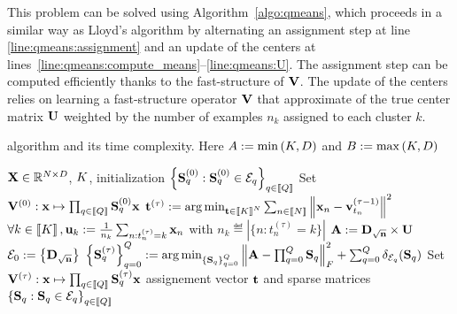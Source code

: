 This problem can be solved using Algorithm~\ref{algo:qmeans},
which proceeds in a similar way as Lloyd's algorithm by alternating an assignment step at line \ref{line:qmeans:assignment} and an update of the centers at lines~\ref{line:qmeans:compute_means}--\ref{line:qmeans:U}. The assignment step can be computed efficiently thanks to the fast-structure of ${\mathbf{V}}$. The update of the centers relies on learning a fast-structure operator ${\mathbf{V}}$ that approximate of the true center matrix ${\mathbf{U}}$ weighted by the number of examples $n_k$ assigned to each cluster $k$.


\begin{algorithm*}[t]
	\caption{\qkmeans algorithm and its time complexity. Here $A := \min\left (K, D\right )$ and $B := \max\left (K, D\right )$}
	\label{algo:qmeans}
	\begin{algorithmic}[1]
\REQUIRE ${\mathbf{X}} \in \mathbb{R}^{N \times D}$, $K$, initialization $\left \lbrace {\mathbf{S}}_q^{(0)} : {\mathbf{S}}_q^{(0)} \in \mathcal{E}_q\right \rbrace_{q\in\left \llbracket Q\right \rrbracket}$
\STATE Set ${\mathbf{V}}^{(0)} : {\mathbf{x}} \mapsto \prod_{q\in\left \llbracket Q\right \rrbracket}{{\mathbf{S}}_q^{(0)}} {\mathbf{x}}$
	\STATE ${\mathbf{t}}^{(\tau)} := \operatorname*{arg\,min}_{{\mathbf{t}} \in \left \llbracket K\right \rrbracket^N} \sum_{n\in\left \llbracket N\right \rrbracket} {\left \|{\mathbf{x}}_n - {\mathbf{v}}^{(\tau -1)}_{t_n}\right \|^2}$
	\label{line:qmeans:assignment}
	\STATE $\forall k\in\left \llbracket K\right \rrbracket, {\mathbf{u}}_k := \frac{1}{n_k} \sum_{n: t_n^{(\tau)}= k} {{\mathbf{x}}_n}$
with $n_k \eqdef |\{n: t_n^{(\tau)}=k\}|$
	\COMMENT{$\bigO{\nexamples\datadim}$}
	\label{line:qmeans:compute_means}
	\STATE ${\mathbf{A}} := {\mathbf{D}}_{\sqrt{{\mathbf{n}}}} \times {\mathbf{U}} $
	\COMMENT{$\bigO{\nclusters\datadim}$}
	\label{line:qmeans:A}
	\STATE $\mathcal{E}_0 := \left \lbrace {\mathbf{D}}_{\sqrt{{\mathbf{n}}}} \right \rbrace$
	\label{line:qmeans:E0}
	\STATE $\left \lbrace {\mathbf{S}}_q^{(\tau)}\right \rbrace_{q=0}^Q := \operatorname*{arg\,min}_{\left \lbrace {\mathbf{S}}_q\right \rbrace_{q=0}^Q} \left \|{\mathbf{A}} - \prod_{q=0}^Q{\mathbf{S}}_q\right \|_F^2 + \sum_{q=0}^Q \delta_{\mathcal{E}_q}({\mathbf{S}}_q)$
	\label{line:qmeans:S}
	\STATE Set ${\mathbf{V}}^{(\tau)} : {\mathbf{x}} \mapsto \prod_{q\in\left \llbracket Q\right \rrbracket}{{\mathbf{S}}_q^{(\tau)}} {\mathbf{x}}$
	\label{line:qmeans:U}
	\ENDFOR
	\ENSURE assignement vector ${\mathbf{t}}$ and sparse matrices $\left \lbrace {\mathbf{S}}_q : {\mathbf{S}}_q \in \mathcal{E}_q\right \rbrace_{q\in\left \llbracket Q\right \rrbracket}$ %
\end{algorithmic}
\end{algorithm*}

